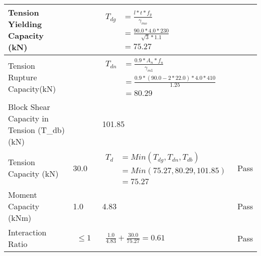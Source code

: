 \documentclass{article}%
\begin{document}
\begin{longtable}{|p{4cm}|p{5cm}|p{5.5cm}|p{1.5cm}|}
\hline%
Tension Yielding Capacity (kN)&&$\begin{aligned} T_{dg} &= \frac{l*t*f_y}{\gamma_{mo}}\\ &=\frac{90.0*4.0*230}{\sqrt{3}*1.1}\\ &=75.27\end{aligned}$&\\%
\hline%
Tension Rupture Capacity(kN)&&$\begin{aligned} T_{dn} &= \frac{0.9*A_{n}*f_u}{\gamma_{m1}}\\ &=\frac{0.9*(90.0-2*22.0)*4.0*410}{1.25}\\ &=80.29\end{aligned}$&\\%
\hline%
Block Shear Capacity in Tension (T\_db) (kN)&&101.85&\\%
\hline%
Tension Capacity (kN)&30.0&$\begin{aligned} T_d &= Min(T_{dg},T_{dn},T_{db})\\ &= Min(75.27,80.29,101.85)\\ &=75.27\end{aligned}$&Pass\\%
\hline%
Moment Capacity (kNm)&1.0&4.83&Pass\\%
\hline%
Interaction Ratio&$\begin{aligned} \leq1\end{aligned}$&$\begin{aligned} \frac{1.0}{4.83}+\frac{30.0}{75.27}=0.61\end{aligned}$&Pass\\%
\hline%
\end{longtable}

%
\end{document}
